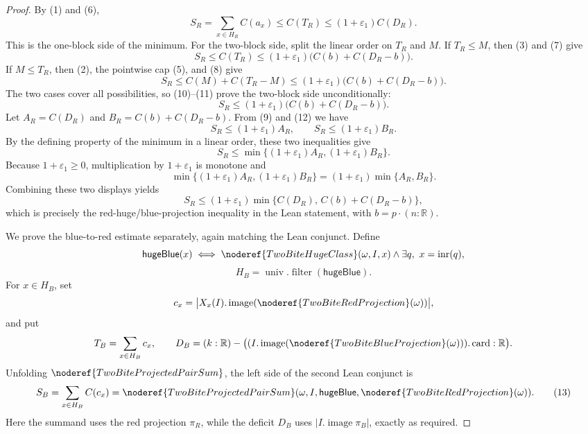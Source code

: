 \begin{proof}
By (1) and (6),
\[
S_R=\sum_{x\in H_R}C(a_x)
\le C(T_R)
\le(1+\varepsilon_1)C(D_R). \tag{9}
\]
This is the one-block side of the minimum.  For the two-block side, split the
linear order on \(T_R\) and \(M\).  If \(T_R\le M\), then (3) and (7) give
\[
S_R\le C(T_R)
\le(1+\varepsilon_1)\bigl(C(b)+C(D_R-b)\bigr). \tag{10}
\]
If \(M\le T_R\), then (2), the pointwise cap (5), and (8) give
\[
S_R\le C(M)+C(T_R-M)
\le(1+\varepsilon_1)\bigl(C(b)+C(D_R-b)\bigr). \tag{11}
\]
The two cases cover all possibilities, so (10)--(11) prove the two-block side
unconditionally:
\[
S_R\le(1+\varepsilon_1)\bigl(C(b)+C(D_R-b)\bigr). \tag{12}
\]
Let \(A_R=C(D_R)\) and \(B_R=C(b)+C(D_R-b)\).  From (9) and (12) we have
\[
S_R\le(1+\varepsilon_1)A_R,\qquad
S_R\le(1+\varepsilon_1)B_R.
\]
By the defining property of the minimum in a linear order, these two
inequalities give
\[
S_R\le\min\{(1+\varepsilon_1)A_R,(1+\varepsilon_1)B_R\}.
\]
Because \(1+\varepsilon_1\ge0\), multiplication by \(1+\varepsilon_1\) is
monotone and
\[
\min\{(1+\varepsilon_1)A_R,(1+\varepsilon_1)B_R\}
=(1+\varepsilon_1)\min\{A_R,B_R\}.
\]
Combining these two displays yields
\[
S_R\le
(1+\varepsilon_1)\min\{C(D_R),\,C(b)+C(D_R-b)\},
\]
which is precisely the red-huge/blue-projection inequality in the Lean
statement, with \(b=p\cdot(n:\mathbb R)\).

We prove the blue-to-red estimate separately, again matching the Lean
conjunct.  Define
\[
\mathsf{hugeBlue}(x)\iff
\noderef{TwoBiteHugeClass}(\omega,I,x)\wedge
  \exists q,\ x=\operatorname{inr}(q),
\]
\[
H_B=\operatorname{univ}.\operatorname{filter}(\mathsf{hugeBlue}).
\]
For \(x\in H_B\), set
\[
c_x=
\bigl|X_x(I).\operatorname{image}
  (\noderef{TwoBiteRedProjection}(\omega))\bigr|,
\]
and put
\[
T_B=\sum_{x\in H_B}c_x,\qquad
D_B=(k:\mathbb R)-
  \bigl((I.\operatorname{image}
    (\noderef{TwoBiteBlueProjection}(\omega))).\operatorname{card}:\mathbb R\bigr).
\]
Unfolding \(\noderef{TwoBiteProjectedPairSum}\), the left side of the second
Lean conjunct is
\[
S_B=\sum_{x\in H_B}C(c_x)
=\noderef{TwoBiteProjectedPairSum}
  (\omega,I,\mathsf{hugeBlue},\noderef{TwoBiteRedProjection}(\omega)). \tag{13}
\]
Here the summand uses the red projection \(\pi_R\), while the deficit \(D_B\)
uses \(|I.\operatorname{image}\pi_B|\), exactly as required.


\end{proof}
